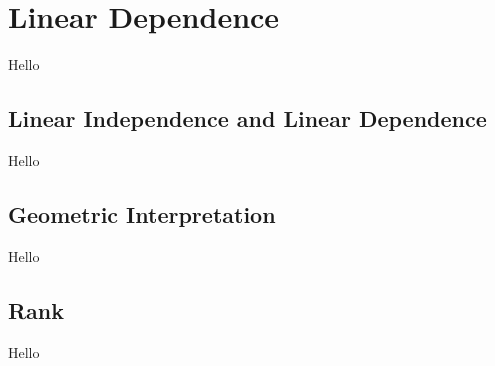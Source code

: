 \chapter{Linear Dependence}
Hello

\section{Linear Independence and Linear Dependence}
Hello

\section{Geometric Interpretation}
Hello

\section{Rank}
Hello
